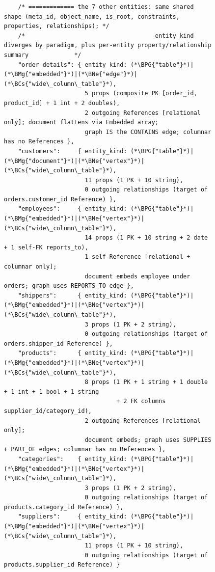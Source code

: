 \begin{figure}[htbp]
\begin{lstlisting}
    /* ============= the 7 other entities: same shared shape (meta_id, object_name, is_root, constraints, properties, relationships); */
    /*                                     entity_kind diverges by paradigm, plus per-entity property/relationship summary             */
    "order_details": { entity_kind: (*\BPG{"table"}*)|(*\BMg{"embedded"}*)|(*\BNe{"edge"}*)|(*\BCs{"wide\_column\_table"}*),
                       5 props (composite PK [order_id, product_id] + 1 int + 2 doubles),
                       2 outgoing References [relational only]; document flattens via Embedded array;
                       graph IS the CONTAINS edge; columnar has no References },
    "customers":     { entity_kind: (*\BPG{"table"}*)|(*\BMg{"document"}*)|(*\BNe{"vertex"}*)|(*\BCs{"wide\_column\_table"}*),
                       11 props (1 PK + 10 string),
                       0 outgoing relationships (target of orders.customer_id Reference) },
    "employees":     { entity_kind: (*\BPG{"table"}*)|(*\BMg{"embedded"}*)|(*\BNe{"vertex"}*)|(*\BCs{"wide\_column\_table"}*),
                       14 props (1 PK + 10 string + 2 date + 1 self-FK reports_to),
                       1 self-Reference [relational + columnar only];
                       document embeds employee under orders; graph uses REPORTS_TO edge },
    "shippers":      { entity_kind: (*\BPG{"table"}*)|(*\BMg{"embedded"}*)|(*\BNe{"vertex"}*)|(*\BCs{"wide\_column\_table"}*),
                       3 props (1 PK + 2 string),
                       0 outgoing relationships (target of orders.shipper_id Reference) },
    "products":      { entity_kind: (*\BPG{"table"}*)|(*\BMg{"embedded"}*)|(*\BNe{"vertex"}*)|(*\BCs{"wide\_column\_table"}*),
                       8 props (1 PK + 1 string + 1 double + 1 int + 1 bool + 1 string
                                + 2 FK columns supplier_id/category_id),
                       2 outgoing References [relational only];
                       document embeds; graph uses SUPPLIES + PART_OF edges; columnar has no References },
    "categories":    { entity_kind: (*\BPG{"table"}*)|(*\BMg{"embedded"}*)|(*\BNe{"vertex"}*)|(*\BCs{"wide\_column\_table"}*),
                       3 props (1 PK + 2 string),
                       0 outgoing relationships (target of products.category_id Reference) },
    "suppliers":     { entity_kind: (*\BPG{"table"}*)|(*\BMg{"embedded"}*)|(*\BNe{"vertex"}*)|(*\BCs{"wide\_column\_table"}*),
                       11 props (1 PK + 10 string),
                       0 outgoing relationships (target of products.supplier_id Reference) }


\end{lstlisting}
\end{figure}
